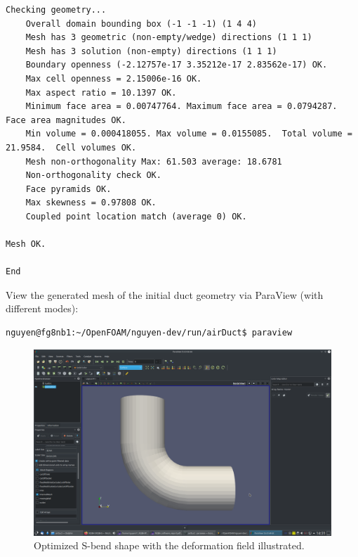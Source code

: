 \documentclass[onsided]{book}
\numberwithin{equation}{section}
\begin{document}
\begin{enumerate}
\begin{verbatim}
Checking geometry...
    Overall domain bounding box (-1 -1 -1) (1 4 4)
    Mesh has 3 geometric (non-empty/wedge) directions (1 1 1)
    Mesh has 3 solution (non-empty) directions (1 1 1)
    Boundary openness (-2.12757e-17 3.35212e-17 2.83562e-17) OK.
    Max cell openness = 2.15006e-16 OK.
    Max aspect ratio = 10.1397 OK.
    Minimum face area = 0.00747764. Maximum face area = 0.0794287.  Face area magnitudes OK.
    Min volume = 0.000418055. Max volume = 0.0155085.  Total volume = 21.9584.  Cell volumes OK.
    Mesh non-orthogonality Max: 61.503 average: 18.6781
    Non-orthogonality check OK.
    Face pyramids OK.
    Max skewness = 0.97808 OK.
    Coupled point location match (average 0) OK.

Mesh OK.

End        
    \end{verbatim}
    View the generated mesh of the initial duct geometry via ParaView (with different modes):
    \begin{verbatim}
nguyen@fg8nb1:~/OpenFOAM/nguyen-dev/run/airDuct$ paraview        
    \end{verbatim}
    
    \begin{figure}[H]
        \centering
        \includegraphics[height=0.44\textheight]{airDuct_Solid_Color_Surface}
        \caption{Optimized S-bend shape with the deformation field illustrated.}
    \end{figure}
    

\end{enumerate}
\end{document}
